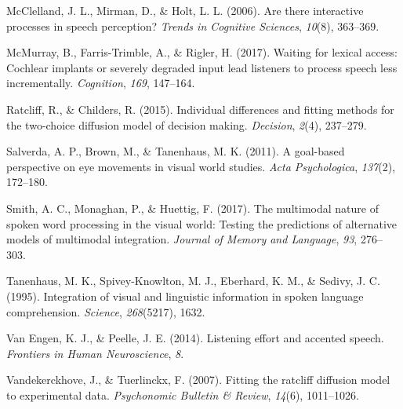 \documentclass[10pt, letterpaper]{article}
\begin{document}
\hypertarget{ref-mcclelland2006there}{}
McClelland, J. L., Mirman, D., \& Holt, L. L. (2006). Are there
interactive processes in speech perception? \emph{Trends in Cognitive
Sciences}, \emph{10}(8), 363--369.

\hypertarget{ref-mcmurray2017waiting}{}
McMurray, B., Farris-Trimble, A., \& Rigler, H. (2017). Waiting for
lexical access: Cochlear implants or severely degraded input lead
listeners to process speech less incrementally. \emph{Cognition},
\emph{169}, 147--164.

\hypertarget{ref-ratcliff2015individual}{}
Ratcliff, R., \& Childers, R. (2015). Individual differences and fitting
methods for the two-choice diffusion model of decision making.
\emph{Decision}, \emph{2}(4), 237--279.

\hypertarget{ref-salverda2011goal}{}
Salverda, A. P., Brown, M., \& Tanenhaus, M. K. (2011). A goal-based
perspective on eye movements in visual world studies. \emph{Acta
Psychologica}, \emph{137}(2), 172--180.

\hypertarget{ref-smith2017multimodal}{}
Smith, A. C., Monaghan, P., \& Huettig, F. (2017). The multimodal nature
of spoken word processing in the visual world: Testing the predictions
of alternative models of multimodal integration. \emph{Journal of Memory
and Language}, \emph{93}, 276--303.

\hypertarget{ref-tanenhaus1995integration}{}
Tanenhaus, M. K., Spivey-Knowlton, M. J., Eberhard, K. M., \& Sedivy, J.
C. (1995). Integration of visual and linguistic information in spoken
language comprehension. \emph{Science}, \emph{268}(5217), 1632.

\hypertarget{ref-van2014listening}{}
Van Engen, K. J., \& Peelle, J. E. (2014). Listening effort and accented
speech. \emph{Frontiers in Human Neuroscience}, \emph{8}.

\hypertarget{ref-vandekerckhove2007fitting}{}
Vandekerckhove, J., \& Tuerlinckx, F. (2007). Fitting the ratcliff
diffusion model to experimental data. \emph{Psychonomic Bulletin \&
Review}, \emph{14}(6), 1011--1026.
\end{document}

